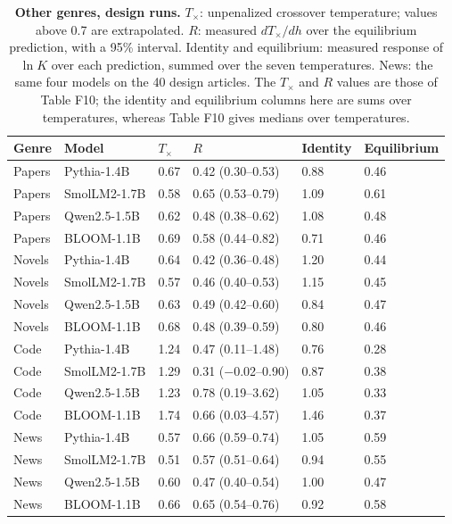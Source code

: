 \documentclass[aps,prx,onecolumn,superscriptaddress,longbibliography]{revtex4-2}
\begin{document}
\begin{table}[htbp]
\centering
\small
\setlength{\tabcolsep}{6pt}
\renewcommand{\thetable}{F12}
\caption{\textbf{Other genres, design runs.} \(T_{\times}\): unpenalized crossover temperature; values above 0.7 are extrapolated. \(R\): measured \(dT_\times/dh\) over the equilibrium prediction, with a 95\% interval. Identity and equilibrium: measured response of \(\ln K\) over each prediction, summed over the seven temperatures. News: the same four models on the 40 design articles. The \(T_{\times}\) and \(R\) values are those of Table F10; the identity and equilibrium columns here are sums over temperatures, whereas Table F10 gives medians over temperatures.}
\label{tabF12}
\begin{tabular}{@{}llllll@{}}
\toprule
Genre & Model & \(T_{\times}\) & \(R\) & Identity & Equilibrium \\
\midrule
Papers & Pythia-1.4B & 0.67 & 0.42 (0.30--0.53) & 0.88 & 0.46 \\
Papers & SmolLM2-1.7B & 0.58 & 0.65 (0.53--0.79) & 1.09 & 0.61 \\
Papers & Qwen2.5-1.5B & 0.62 & 0.48 (0.38--0.62) & 1.08 & 0.48 \\
Papers & BLOOM-1.1B & 0.69 & 0.58 (0.44--0.82) & 0.71 & 0.46 \\
Novels & Pythia-1.4B & 0.64 & 0.42 (0.36--0.48) & 1.20 & 0.44 \\
Novels & SmolLM2-1.7B & 0.57 & 0.46 (0.40--0.53) & 1.15 & 0.45 \\
Novels & Qwen2.5-1.5B & 0.63 & 0.49 (0.42--0.60) & 0.84 & 0.47 \\
Novels & BLOOM-1.1B & 0.68 & 0.48 (0.39--0.59) & 0.80 & 0.46 \\
Code & Pythia-1.4B & 1.24 & 0.47 (0.11--1.48) & 0.76 & 0.28 \\
Code & SmolLM2-1.7B & 1.29 & 0.31 (−0.02--0.90) & 0.87 & 0.38 \\
Code & Qwen2.5-1.5B & 1.23 & 0.78 (0.19--3.62) & 1.05 & 0.33 \\
Code & BLOOM-1.1B & 1.74 & 0.66 (0.03--4.57) & 1.46 & 0.37 \\
News & Pythia-1.4B & 0.57 & 0.66 (0.59--0.74) & 1.05 & 0.59 \\
News & SmolLM2-1.7B & 0.51 & 0.57 (0.51--0.64) & 0.94 & 0.55 \\
News & Qwen2.5-1.5B & 0.60 & 0.47 (0.40--0.54) & 1.00 & 0.47 \\
News & BLOOM-1.1B & 0.66 & 0.65 (0.54--0.76) & 0.92 & 0.58 \\
\bottomrule
\end{tabular}
\end{table}
\end{document}
